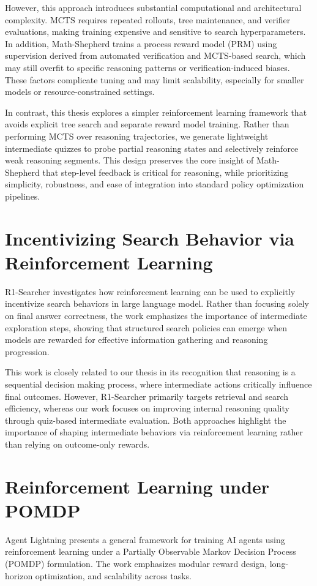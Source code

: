 \documentclass[12pt]{report}
\begin{document}
However, this approach introduces substantial computational and architectural complexity. MCTS requires repeated rollouts, tree maintenance, and verifier evaluations, making training expensive and sensitive to search hyperparameters. In addition, Math-Shepherd trains a process reward model (PRM) using supervision derived from automated verification and MCTS-based search, which may still overfit to specific reasoning patterns or verification-induced biases. These factors complicate tuning and may limit scalability, especially for smaller models or resource-constrained settings.

In contrast, this thesis explores a simpler reinforcement learning framework that avoids explicit tree search and separate reward model training. Rather than performing MCTS over reasoning trajectories, we generate lightweight intermediate quizzes to probe partial reasoning states and selectively reinforce weak reasoning segments. This design preserves the core insight of Math-Shepherd that step-level feedback is critical for reasoning, while prioritizing simplicity, robustness, and ease of integration into standard policy optimization pipelines.

\section{Incentivizing Search Behavior via Reinforcement Learning}
R1-Searcher investigates how reinforcement learning can be used to explicitly incentivize search behaviors in large language model\cite{song2025r1searcherincentivizingsearchcapability}. Rather than focusing solely on final answer correctness, the work emphasizes the importance of intermediate exploration steps, showing that structured search policies can emerge when models are rewarded for effective information gathering and reasoning progression.

This work is closely related to our thesis in its recognition that reasoning is a sequential decision making process, where intermediate actions critically influence final outcomes. However, R1-Searcher primarily targets retrieval and search efficiency, whereas our work focuses on improving internal reasoning quality through quiz-based intermediate evaluation. Both approaches highlight the importance of shaping intermediate behaviors via reinforcement learning rather than relying on outcome-only rewards.

\section{Reinforcement Learning under POMDP}
Agent Lightning presents a general framework for training AI agents using reinforcement learning under a Partially Observable Markov Decision Process (POMDP) formulation\cite{luo2025agentlightningtrainai}. The work emphasizes modular reward design, long-horizon optimization, and scalability across tasks.
\end{document}
